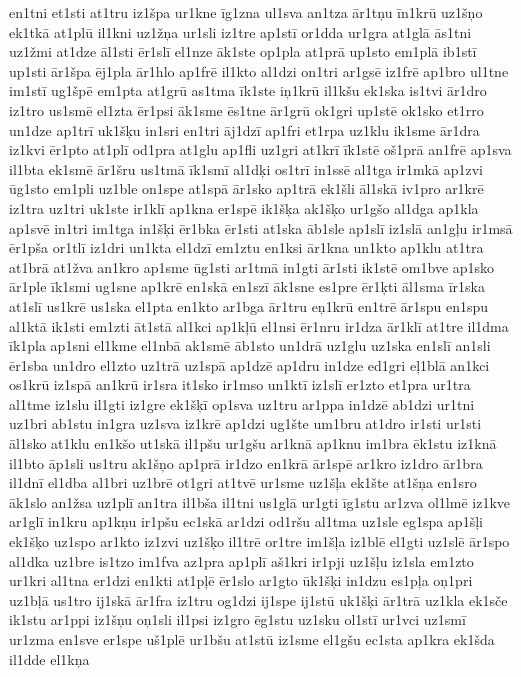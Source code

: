 {en1tni
et1sti
at1tru
iz1špa
ur1kne
īg1zna
ul1sva
an1tza
ār1tņu
īn1krū
uz1šņo
ek1tkā
at1plū
il1kni
uz1žņa
ur1sli
iz1tre
ap1stī
or1dda
ur1gra
at1glā
ās1tni
uz1žmi
at1dze
āl1sti
ēr1slī
el1nze
āk1ste
op1pla
at1prā
up1sto
em1plā
ib1stī
up1sti
ār1špa
ēj1pla
ār1hlo
ap1frē
il1kto
al1dzi
on1tri
ar1gsē
iz1frē
ap1bro
ul1tne
im1stī
ug1špē
em1pta
at1grū
as1tma
īk1ste
iņ1krū
il1kšu
ek1ska
is1tvi
ār1dro
iz1tro
us1smē
el1zta
ēr1psi
āk1sme
ēs1tne
ār1grū
ok1gri
up1stē
ok1sko
et1rro
un1dze
ap1trī
uk1šķu
in1sri
en1tri
āj1dzī
ap1fri
et1rpa
uz1klu
ik1sme
ār1dra
iz1kvi
ēr1pto
at1plī
od1pra
at1glu
ap1fli
uz1gri
at1krī
īk1stē
oš1prā
an1frē
ap1sva
il1bta
ek1smē
ār1šru
us1tmā
īk1smī
al1dķi
os1trī
in1ssē
al1tga
ir1mkā
ap1zvi
ūg1sto
em1pli
uz1ble
on1spe
at1spā
ār1sko
ap1trā
ek1šli
āl1skā
iv1pro
ar1krē
iz1tra
uz1tri
uk1ste
ir1klī
ap1kna
er1spē
ik1šķa
ak1šķo
ur1gšo
al1dga
ap1kla
ap1svē
in1tri
im1tga
in1šķi
ēr1bka
ēr1sti
at1ska
āb1sle
ap1slī
iz1slā
an1gļu
ir1msā
ēr1pša
or1tlī
iz1dri
un1kta
el1dzī
em1ztu
en1ksi
ār1kna
un1kto
ap1klu
at1tra
at1brā
at1žva
an1kro
ap1sme
ūg1sti
ar1tmā
in1gti
ār1sti
ik1stē
om1bve
ap1sko
ār1ple
īk1smi
ug1sne
ap1krē
en1skā
en1szī
āk1sne
es1pre
ēr1ķti
āl1sma
īr1ska
at1slī
us1krē
us1ska
el1pta
en1kto
ar1bga
ār1tru
eņ1krū
en1trē
ār1spu
en1spu
al1ktā
ik1sti
em1zti
āt1stā
al1kci
ap1kļū
el1nsi
ēr1nru
ir1dza
ār1klī
at1tre
il1dma
īk1pla
ap1sni
el1kme
el1nbā
ak1smē
āb1sto
un1drā
uz1glu
uz1ska
en1slī
an1sli
ēr1sba
un1dro
el1zto
uz1trā
uz1spā
ap1dzē
ap1dru
in1dze
ed1gri
eļ1blā
an1kci
os1krū
iz1spā
an1krū
ir1sra
it1sko
ir1mso
un1ktī
iz1slī
er1zto
et1pra
ur1tra
al1tme
iz1slu
il1gti
iz1gre
ek1šķī
op1sva
uz1tru
ar1ppa
in1dzē
ab1dzi
ur1tni
uz1bri
ab1stu
in1gra
uz1sva
iz1krē
ap1dzi
ug1šte
um1bru
at1dro
ir1sti
ur1sti
āl1sko
at1klu
en1kšo
ut1skā
il1pšu
ur1gšu
ar1knā
ap1knu
im1bra
ēk1stu
iz1knā
il1bto
āp1sli
us1tru
ak1šņo
ap1prā
ir1dzo
en1krā
ār1spē
ar1kro
iz1dro
ār1bra
il1dnī
el1dba
al1bri
uz1brē
ot1gri
at1tvē
ur1sme
uz1šļa
ek1šte
at1šņa
en1sro
āk1slo
an1žsa
uz1plī
an1tra
il1bša
il1tni
us1glā
ur1gti
īg1stu
ar1zva
ol1lmē
iz1kve
ar1glī
in1kru
ap1kņu
ir1pšu
ec1skā
ar1dzi
od1ršu
al1tma
uz1sle
eg1spa
ap1šļi
ek1šķo
uz1spo
ar1kto
iz1zvi
uz1šķo
il1trē
or1tre
im1šļa
iz1blē
el1gti
uz1slē
ār1spo
al1dka
uz1bre
is1tzo
im1fva
az1pra
ap1plī
aš1kri
ir1pji
uz1šļu
iz1sla
em1zto
ur1kri
al1tna
er1dzi
en1kti
at1pļē
ēr1slo
ar1gto
ūk1šķi
in1dzu
es1pļa
oņ1pri
uz1bļā
us1tro
ij1skā
ār1fra
iz1tru
og1dzi
ij1spe
ij1stū
uk1šķi
ār1trā
uz1kla
ek1sče
ik1stu
ar1ppi
iz1šņu
oņ1sli
il1psi
iz1gro
ēg1stu
uz1sku
ol1stī
ur1vci
uz1smī
ur1zma
en1sve
er1spe
uš1plē
ur1bšu
at1stū
iz1sme
el1gšu
ec1sta
ap1kra
ek1šda
il1dde
el1kņa
}
